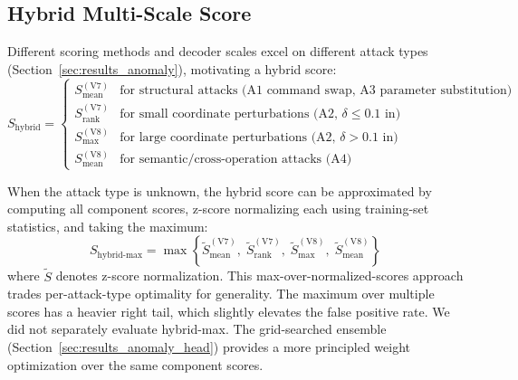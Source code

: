 \subsection{Hybrid Multi-Scale Score}
\label{sec:hybrid_score}

Different scoring methods and decoder scales excel on different attack types (Section~\ref{sec:results_anomaly}), motivating a hybrid score:
\begin{equation}
    S_{\text{hybrid}} = \begin{cases}
        S_{\text{mean}}^{(\text{V7})} & \text{for structural attacks (A1 command swap, A3 parameter substitution)} \\
        S_{\text{rank}}^{(\text{V7})} & \text{for small coordinate perturbations (A2, $\delta \leq 0.1$~in)} \\
        S_{\max}^{(\text{V8})} & \text{for large coordinate perturbations (A2, $\delta > 0.1$~in)} \\
        S_{\text{mean}}^{(\text{V8})} & \text{for semantic/cross-operation attacks (A4)}
    \end{cases}
    \label{eq:s_hybrid}
\end{equation}

When the attack type is unknown, the hybrid score can be approximated by computing all component scores, z-score normalizing each using training-set statistics, and taking the maximum:
\begin{equation}
    S_{\text{hybrid-max}} = \max\left\{ \tilde{S}_{\text{mean}}^{(\text{V7})}, \; \tilde{S}_{\text{rank}}^{(\text{V7})}, \; \tilde{S}_{\max}^{(\text{V8})}, \; \tilde{S}_{\text{mean}}^{(\text{V8})} \right\}
    \label{eq:s_hybrid_max}
\end{equation}
where $\tilde{S}$ denotes z-score normalization.
This max-over-normalized-scores approach trades per-attack-type optimality for generality.
The maximum over multiple scores has a heavier right tail, which slightly elevates the false positive rate.
We did not separately evaluate hybrid-max.
The grid-searched ensemble (Section~\ref{sec:results_anomaly_head}) provides a more principled weight optimization over the same component scores.
